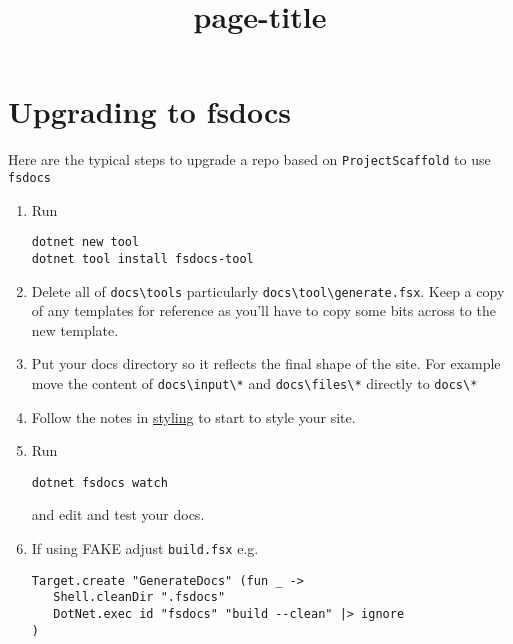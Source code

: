 \documentclass{article}
\title{{page-title}}
\date{}
\begin{document}
\maketitle


\section*{Upgrading to fsdocs}



Here are the typical steps to upgrade a repo based on \texttt{ProjectScaffold} to use \texttt{fsdocs}
\begin{enumerate}
\item 

Run
\begin{lstlisting}
dotnet new tool
dotnet tool install fsdocs-tool

\end{lstlisting}

\item 

Delete all of \texttt{docs{\textbackslash}tools} particularly \texttt{docs{\textbackslash}tool{\textbackslash}generate.fsx}.  Keep a copy of any templates for reference as you'll have to copy some bits across to the new template.

\item 

Put your docs directory so it reflects the final shape of the site. For example move the content of \texttt{docs{\textbackslash}input{\textbackslash}*} and \texttt{docs{\textbackslash}files{\textbackslash}*} directly to \texttt{docs{\textbackslash}*}

\item 

Follow the notes in \href{styling.html}{styling} to start to style your site.

\item 

Run
\begin{lstlisting}
dotnet fsdocs watch

\end{lstlisting}


and edit and test your docs.

\item 

If using FAKE adjust \texttt{build.fsx} e.g.
\begin{lstlisting}
Target.create "GenerateDocs" (fun _ ->
   Shell.cleanDir ".fsdocs"
   DotNet.exec id "fsdocs" "build --clean" |> ignore
)


\end{lstlisting}
\end{enumerate}
\end{document}
